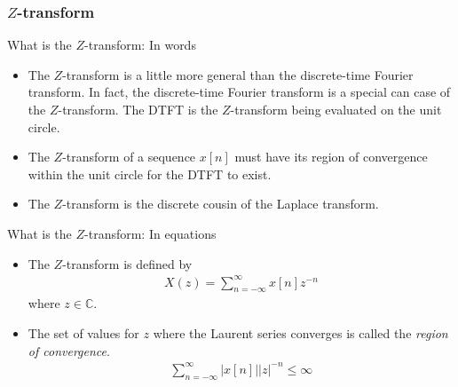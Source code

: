 \documentclass[mathserif,9pt,handout]{beamer}
\begin{document}
\begin{frame}\frametitle{$Z$-transform}\small
  \begin{block}{What is the $Z$-transform: In words}
    \begin{itemize}
      \item The $Z$-transform is a little more general than the discrete-time Fourier transform. In fact, the discrete-time Fourier transform is a special can case of the $Z$-transform. The DTFT is the $Z$-transform being evaluated on the unit circle. 
      \item The $Z$-transform of a sequence $x[n]$ must have its region of convergence within the unit circle for the DTFT to exist. 
      \item The $Z$-transform is the discrete cousin of the Laplace transform. 
    \end{itemize}
  \end{block}
  
  \begin{exampleblock}{What is the $Z$-transform: In equations}
    \begin{itemize}
      \item The $Z$-transform is defined by
        \begin{align}
          X(z) = \sum_{n=-\infty}^{\infty} x[n] z^{-n} 
          \nonumber
        \end{align}
        where $z \in \mathbb{C}$.
      \item The set of values for $z$ where the Laurent series converges is called the {\em\color{green!50!black}region of convergence}. 
        \begin{align}
          \sum_{n=-\infty}^{\infty} |x[n]| |z|^{-n} \leq \infty
          \nonumber
        \end{align}
    \end{itemize}
  \end{exampleblock}
\end{frame}
\end{document}

